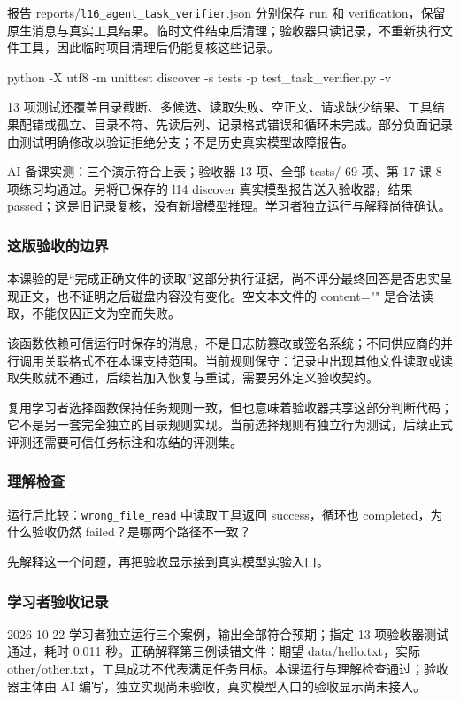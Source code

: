 报告 reports/\nolinkurl{l16_agent_task_verifier}.json 分别保存 run 和 verification，保留原生消息与真实工具结果。临时文件结束后清理；验收器只读记录，不重新执行文件工具，因此临时项目清理后仍能复核这些记录。

\begin{Code}
python -X utf8 -m unittest discover -s tests -p test_task_verifier.py -v
\end{Code}

13 项测试还覆盖目录截断、多候选、读取失败、空正文、请求缺少结果、工具结果配错或孤立、目录不符、先读后列、记录格式错误和循环未完成。部分负面记录由测试明确修改以验证拒绝分支；不是历史真实模型故障报告。

AI 备课实测：三个演示符合上表；验收器 13 项、全部 tests/ 69 项、第 17 课 8 项练习均通过。另将已保存的 l14 discover 真实模型报告送入验收器，结果 passed；这是旧记录复核，没有新增模型推理。学习者独立运行与解释尚待确认。

\subsubsection{这版验收的边界}

本课验的是“完成正确文件的读取”这部分执行证据，尚不评分最终回答是否忠实呈现正文，也不证明之后磁盘内容没有变化。空文本文件的 content="" 是合法读取，不能仅因正文为空而失败。

该函数依赖可信运行时保存的消息，不是日志防篡改或签名系统；不同供应商的并行调用关联格式不在本课支持范围。当前规则保守：记录中出现其他文件读取或读取失败就不通过，后续若加入恢复与重试，需要另外定义验收契约。

复用学习者选择函数保持任务规则一致，但也意味着验收器共享这部分判断代码；它不是另一套完全独立的目录规则实现。当前选择规则有独立行为测试，后续正式评测还需要可信任务标注和冻结的评测集。

\subsubsection{理解检查}

运行后比较：\nolinkurl{wrong_file_read} 中读取工具返回 success，循环也 completed，为什么验收仍然 failed？是哪两个路径不一致？

先解释这一个问题，再把验收显示接到真实模型实验入口。

\subsubsection{学习者验收记录}

2026-10-22 学习者独立运行三个案例，输出全部符合预期；指定 13 项验收器测试通过，耗时 0.011 秒。正确解释第三例读错文件：期望 data/hello.txt，实际 other/other.txt，工具成功不代表满足任务目标。本课运行与理解检查通过；验收器主体由 AI 编写，独立实现尚未验收，真实模型入口的验收显示尚未接入。

